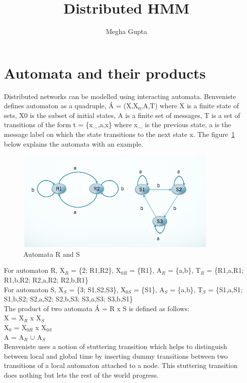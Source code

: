 \documentclass[letterpaper]{article}
\begin{document}
\title{Distributed HMM}
\author{Megha Gupta}
\maketitle
\section{Automata and their products}
\label{sec:intro}

Distributed networks can be modelled using interacting automata. Benveniste defines automaton as a quadruple, \'{A} = (X,X$_{0}$,A,T) where X is a finite state of sets, X0 is the subset of initial states, A is a finite set of messages, T is a set of transitions of the form t = \{x\_,a,x\} where x\_ is the previous state, a is the message label on which the state transitions to the next state x. The figure~\ref{fig:ex} below explains the automata with an example.\\

\begin{figure}[t]
\centering
\includegraphics[width=10cm,height=5cm]{automata.png}
\caption{Automata R and S}
\label{fig:ex}
\end{figure}

For automaton R, X$_{R}$ = \{2; R1,R2\}, X$_{0R}$ = \{R1\}, A$_{R}$ = \{a,b\}, T$_{R}$ = \{R1,a,R1; R1,b,R2; R2,a,R2; R2,b,R1\} \\
For automaton S, X$_{S}$ = \{3; S1,S2,S3\}, X$_{0S}$ = \{S1\}, A$_{S}$ = \{a,b\}, T$_{S}$ = \{S1,a,S1; S1,b,S2; S2,a,S2; S2,b,S3; S3,a,S3; S3,b,S1\} \\
The product of two automata \'{A} = R x S is defined as follows: \\
X = X$_{R}$ x X$_{S}$ \\
X$_{0}$ = X$_{0R}$ x X$_{0S}$ \\
A = A$_{R}$ $\cup$ A$_{S}$ \\
Benveniste uses a notion of stuttering transition which helps to distinguish between local and global time by inserting dummy transitions between two transitions of a local automaton attached to a node. This stuttering transition does nothing but lets the rest of the world progress.
\end{document}
